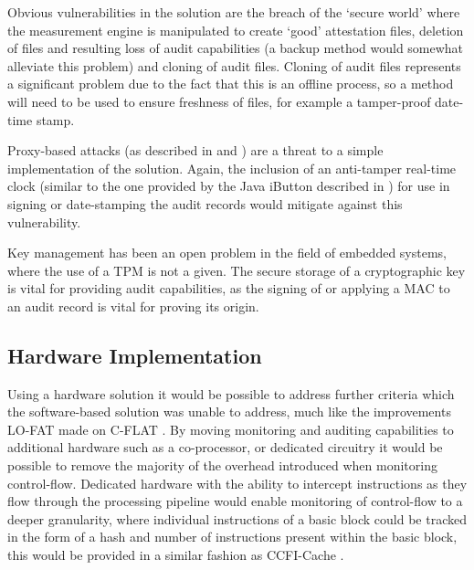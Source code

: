 Obvious vulnerabilities in the solution are the breach of the `secure world' where the measurement engine is manipulated to create `good' attestation files, deletion of files and resulting loss of audit capabilities (a backup method would somewhat alleviate this problem) and cloning of audit files. Cloning of audit files represents a significant problem due to the fact that this is an offline process, so a method will need to be used to ensure freshness of files, for example a tamper-proof date-time stamp.

Proxy-based attacks (as described in \cite{Seshadri2007} and \cite{Li2011}) are a threat to a simple implementation of the solution. Again, the inclusion of an anti-tamper real-time clock (similar to the one provided by the Java iButton described in \cite{Chong2003}) for use in signing or date-stamping the audit records would mitigate against this vulnerability.

Key management has been an open problem in the field of embedded systems, where the use of a TPM is not a given. The secure storage of a cryptographic key is vital for providing audit capabilities, as the signing of or applying a MAC to an audit record is vital for proving its origin.

\subsection{Hardware Implementation}
Using a hardware solution it would be possible to address further criteria which the software-based solution was unable to address, much like the improvements LO-FAT\cite{Dessouky2017} made on C-FLAT \cite{Abera2016}. By moving monitoring and auditing capabilities to additional hardware such as a co-processor, or dedicated circuitry it would be possible to remove the majority of the overhead introduced when monitoring control-flow. Dedicated hardware with the ability to intercept instructions as they flow through the processing pipeline would enable monitoring of control-flow to a deeper granularity, where individual instructions of a basic block could be tracked in the form of a hash and number of instructions present within the basic block, this would be provided in a similar fashion as CCFI-Cache \cite{Danger2018}.
